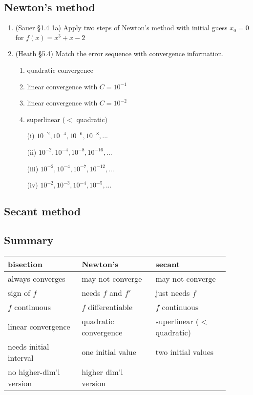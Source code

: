 \documentclass[12pt,letterpaper,noanswers]{exam}
\begin{document}
\subsection*{Newton's method}

\begin{enumerate}[resume]
    \item (Sauer \S1.4 1a) Apply two steps of Newton's method with initial guess $x_0 = 0$ for $f(x) = x^3+x-2$
    \vspace{1in}
    
    \item (Heath \S 5.4) Match the error sequence with convergence information.
    
    \begin{enumerate}
    \item quadratic convergence
    \item linear convergence with $C = 10^{-1}$
    \item linear convergence with $C = 10^{-2}$
    \item superlinear ($<$ quadratic)
    \end{enumerate}
    
    \begin{enumerate}
    \item[(i)] $10^{-2},10^{-4},10^{-6},10^{-8},...$
    \item[(ii)] $10^{-2},10^{-4},10^{-8},10^{-16},...$
    \item[(iii)] $10^{-2},10^{-4},10^{-7},10^{-12},...$
    \item[(iv)] $10^{-2},10^{-3},10^{-4},10^{-5},...$
    \end{enumerate}
\end{enumerate}

\subsection*{Secant method}


\subsection*{Summary}
\begin{tabular}{p{0.3\linewidth} p{0.3\linewidth} p{0.3\linewidth}}
bisection & Newton's & secant \\
\hline
always converges & may not converge & may not converge\\
sign of $f$  & needs $f$ and $f'$ & just needs $f$ \\
$f$ continuous & $f$ differentiable & $f$ continuous\\
linear convergence & quadratic convergence & superlinear ($<$ quadratic) \\
needs initial interval & one initial value& two initial values\\
no higher-dim'l version & higher dim'l version & \\
\end{tabular}
\end{document}
